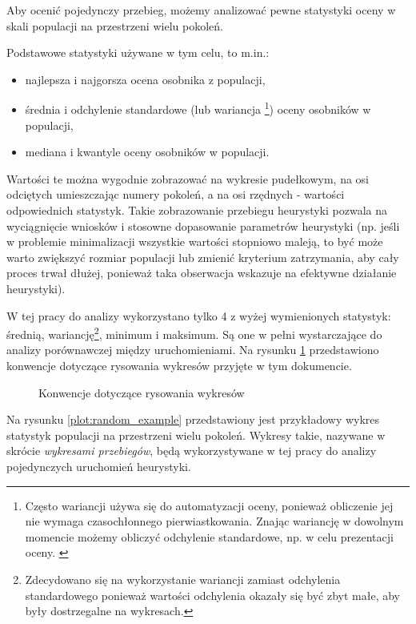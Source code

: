 \documentclass[twoside]{iisthesis}
\newcommand{\graph}[1]{}
\begin{document}
Aby ocenić pojedynczy przebieg, możemy analizować pewne statystyki oceny w skali populacji na przestrzeni wielu pokoleń.

Podstawowe statystyki używane w tym celu, to m.in.:
\begin{itemize}
	\item najlepsza i najgorsza ocena osobnika z populacji,
	\item średnia i odchylenie standardowe (lub wariancja \footnote{Często wariancji używa się do automatyzacji oceny, ponieważ obliczenie jej nie wymaga czasochłonnego pierwiastkowania. Znając wariancję w dowolnym momencie możemy obliczyć odchylenie standardowe, np. w celu prezentacji oceny.  \label{footer:variance}}) oceny osobników w populacji,
	\item mediana i kwantyle oceny osobników w populacji.
\end{itemize}

Wartości te można wygodnie zobrazować na wykresie pudełkowym, na osi odciętych umieszczając numery pokoleń, a na osi rzędnych - wartości odpowiednich statystyk. Takie zobrazowanie przebiegu heurystyki pozwala na wyciągnięcie wniosków i stosowne dopasowanie parametrów heurystyki (np. jeśli w problemie minimalizacji wszystkie wartości stopniowo maleją, to być może warto zwiększyć rozmiar populacji lub zmienić kryterium zatrzymania, aby cały proces trwał dłużej, ponieważ taka obserwacja wskazuje na efektywne działanie heurystyki).

W tej pracy do analizy wykorzystano tylko 4 z wyżej wymienionych statystyk: średnią, wariancję\footnote{Zdecydowano się na wykorzystanie wariancji zamiast odchylenia standardowego ponieważ wartości odchylenia okazały się być zbyt małe, aby były dostrzegalne na wykresach.}, minimum i maksimum. Są one w pełni wystarczające do analizy porównawczej między uruchomieniami. Na rysunku \ref{plot:conventions} przedstawiono konwencje dotyczące rysowania wykresów przyjęte w tym dokumencie.

\begin{figure}[H]
	\caption{Konwencje dotyczące rysowania wykresów \label{plot:conventions}}
	\centering
	\graph{example_whiskers.tex}
\end{figure}

Na rysunku \ref{plot:random_example} przedstawiony jest przykładowy wykres statystyk populacji na przestrzeni wielu pokoleń. Wykresy takie, nazywane w skrócie \emph{wykresami przebiegów}, będą wykorzystywane w tej pracy do analizy pojedynczych uruchomień heurystyki. 
\end{document}
